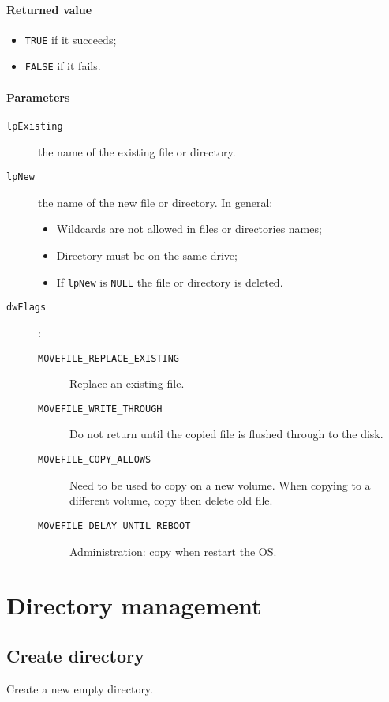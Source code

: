 \paragraph{Returned value}
\begin{itemize}
\item \texttt{TRUE} if it succeeds;
\item \texttt{FALSE} if it fails.
\end{itemize}

\paragraph{Parameters}
\begin{description}
\item [\texttt{lpExisting}] the name of the existing file or directory.
\item [\texttt{lpNew}] the name of the new file or directory. In general:
\begin{itemize}
\item Wildcards are not allowed in files or directories names;
\item Directory must be on the same drive;
\item If \texttt{lpNew} is \texttt{NULL} the file or directory is deleted.
\end{itemize}
\item [\texttt{dwFlags}]:
\begin{description}
\item [\texttt{MOVEFILE\_REPLACE\_EXISTING}] Replace an existing file.
\item [\texttt{MOVEFILE\_WRITE\_THROUGH}] Do not return until the copied file is flushed through to the disk.
\item [\texttt{MOVEFILE\_COPY\_ALLOWS}] Need to be used to copy on a new volume. When copying to a different volume, copy then delete old file.
\item [\texttt{MOVEFILE\_DELAY\_UNTIL\_REBOOT}] Administration: copy when restart the OS.
\end{description}
\end{description}

\section{Directory management}
\subsection{Create directory}
Create a new empty directory.


